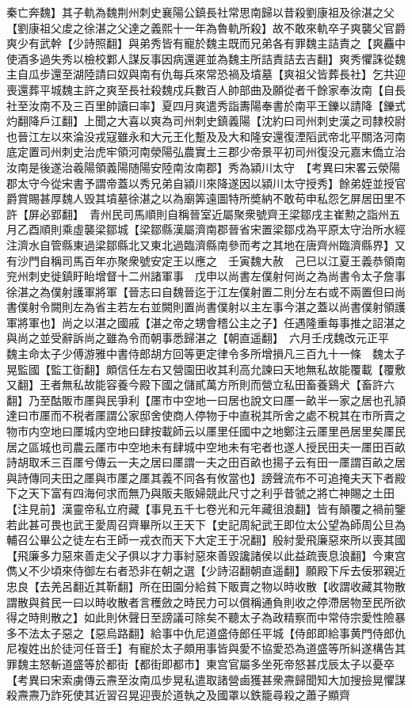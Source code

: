 秦亡奔魏】其子軌為魏荆州刺史襄陽公鎮長社常思南歸以昔殺劉康祖及徐湛之父【劉康祖父䖍之徐湛之父達之義熙十一年為魯軌所殺】故不敢來軌卒子爽襲父官爵爽少有武幹【少詩照翻】與弟秀皆有寵於魏主既而兄弟各有罪魏主詰責之【爽麤中使酒多過失秀以檢校鄴人謀反事因病還遲並為魏主所詰責詰去吉翻】爽秀懼誅從魏主自瓜步還至湖陸請曰奴與南有仇每兵來常恐禍及墳墓【爽祖父皆葬長社】乞共迎喪還葬平城魏主許之爽至長社殺魏戍兵數百人帥部曲及願從者千餘家奉汝南【自長社至汝南不及三百里帥讀曰率】夏四月爽遣秀詣夀陽奉書於南平王鑠以請降【鑠式灼翻降戶江翻】上聞之大喜以爽為司州刺史鎮義陽【沈約曰司州刺史漢之司隸校尉也晉江左以來淪没戎寇雖永和大元王化蹔及及大和隆安還復湮䧟武帝北平關洛河南底定置司州刺史治虎牢領河南滎陽弘農實土三郡少帝景平初司州復没元嘉末僑立治汝南是後遂治羲陽領義陽随陽安陸南汝南郡】秀為潁川太守　【考異曰宋畧云滎陽郡太守今從宋書予謂帝蓋以秀兄弟自潁川來降遂因以潁川太守授秀】餘弟姪並授官爵賞賜甚厚魏人毁其墳墓徐湛之以為廟筭遠圖特所奬納不敢苟申私怨乞屏居田里不許【屏必郢翻】　青州民司馬順則自稱晉室近屬聚衆號齊王梁鄒戌主崔勲之詣州五月乙酉順則乘虛襲梁鄒城【梁鄒縣漢屬濟南郡晉省宋置梁鄒戍為平原太守治所水經注濟水自管縣東過梁鄒縣北又東北過臨濟縣南參而考之其地在唐齊州臨濟縣界】又有沙門自稱司馬百年亦聚衆號安定王以應之　壬寅魏大赦　己巳以江夏王義恭領南兖州刺史徙鎮盱眙增督十二州諸軍事　戊申以尚書左僕射何尚之為尚書令太子詹事徐湛之為僕射護軍將軍【晉志曰自魏晉迄于江左僕射置二則分左右或不兩置但曰尚書僕射令闕則左為省主若左右並闕則置尚書僕射以主左事今湛之蓋以尚書僕射領護軍將軍也】尚之以湛之國戚【湛之帝之甥會稽公主之子】任遇隆重每事推之詔湛之與尚之並受辭訴尚之雖為令而朝事悉歸湛之【朝直遥翻】　六月壬戌魏改元正平　魏主命太子少傅游雅中書侍郎胡方回等更定律令多所增損凡三百九十一條　魏太子晃監國【監工衘翻】頗信任左右又營園田收其利高允諫曰天地無私故能覆載【覆敷又翻】王者無私故能容養今殿下國之儲貳萬方所則而營立私田畜養鷄犬【畜許六翻】乃至酤販市㕓與民爭利【㕓市中空地一曰居也說文曰㕓一畝半一家之居也孔頴達曰市㕓而不税者㕓謂公家邸舍使商人停物于中直税其所舍之處不稅其在市所賣之物市内空地曰㕓城内空地曰肆按載師云以㕓里任國中之地鄭注云㕓里邑居里矣㕓民居之區城也司農云㕓市中空地未有肆城中空地未有宅者也遂人授民田夫一㕓田百畝詩胡取禾三百㕓兮傳云一夫之居曰㕓謂一夫之田百畝也揚子云有田一㕓謂百畝之居與詩傳同夫田之㕓與市㕓之㕓其義不同各有攸當也】謗聲流布不可追掩夫天下者殿下之天下富有四海何求而無乃與販夫販婦競此尺寸之利乎昔虢之將亡神賜之土田【注見前】漢靈帝私立府藏【事見五千七卷光和元年藏徂浪翻】皆有顛覆之禍前鑒若此甚可畏也武王愛周召齊畢所以王天下【史記周紀武王即位太公望為師周公旦為輔召公畢公之徒左右王師一戎衣而天下大定王于况翻】殷紂愛飛廉惡來所以喪其國【飛廉多力惡來善走父子俱以才力事紂惡來善毀讒諸侯以此益疏喪息浪翻】今東宫儁乂不少頃來侍御左右者恐非在朝之選【少詩沼翻朝直遥翻】願殿下斥去佞邪親近忠良【去羌呂翻近其靳翻】所在田園分給貧下販賣之物以時收散【收謂收藏其物散謂散與貧民一曰以時收散者言穫斂之時民力可以償稱通負則收之停滯居物至民所欲得之時則散之】如此則休聲日至謗議可除矣不聽太子為政精察而中常侍宗愛性險暴多不法太子惡之【惡烏路翻】給事中仇尼道盛侍郎任平城【侍郎即給事黄門侍郎仇尼複姓出於徒河任音壬】有寵於太子頗用事皆與愛不協愛恐為道盛等所糾遂構告其罪魏主怒斬道盛等於都街【都街即都市】東宫官屬多坐死帝怒甚戊辰太子以憂卒　【考異曰宋索虜傳云燾至汝南瓜步晃私遣取諸營鹵獲甚衆燾歸聞知大加搜撿晃懼謀殺燾燾乃詐死使其近習召晃迎喪於道執之及國罩以鉄籠尋殺之蕭子顯齊